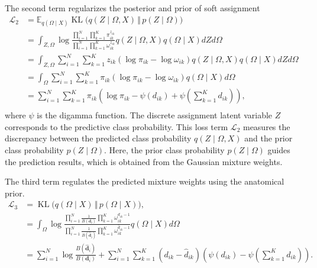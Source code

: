 \documentclass[preprint,12pt]{elsarticle}
\begin{document}
The second term regularizes the posterior and prior of soft assignment
\begin{equation}
\label{loss2}
\begin{split}
  \mathcal{L}_2  &= \mathbb{E}_{q(\Omega\mid X)}\operatorname{KL}\big(q(Z\mid \Omega, X)\,\Vert\,p(Z\mid \Omega)\big)\\
  &= \int_{Z,\Omega} \log \frac{\prod_{i=1}^N\prod_{k=1}^K \pi_{ik}^{z_{ik}}}{\prod_{i=1}^N\prod_{k=1}^K \omega_{ik}^{z_{ik}}} q(Z\mid \Omega, X)q(\Omega\mid X)dZd\Omega\\
  &= \int_{Z,\Omega} \sum_{i=1}^N\sum_{k=1}^K z_{ik} \left(\log\pi_{ik}- \log \omega_{ik} \right)q(Z\mid \Omega, X)q(\Omega\mid X)dZd\Omega\\ 
  &= \int_{\Omega} \sum_{i=1}^N\sum_{k=1}^K \pi_{ik} \left(\log\pi_{ik}- \log \omega_{ik} \right)q(\Omega\mid X)d\Omega\\   
  &= \sum_{i=1}^N\sum_{k=1}^K \pi_{ik} \left(\log\pi_{ik}- \psi(d_{ik}) +\psi\left(\sum_{k=1}^K d_{ik}\right) \right),\\     
\end{split}
\end{equation}
where $\psi$ is the digamma function.
The discrete assignment latent variable $Z$ corresponds to the predictive class probability. This loss term $\mathcal{L}_2$ measures the discrepancy between the predicted class probability $q(Z\mid \Omega, X)$ and the prior class probability $p(Z\mid \Omega)$. 
Here, the prior class probability $p(Z\mid \Omega)$ guides the prediction results, which is obtained from the Gaussian mixture weights. 


The third term regulates the predicted mixture weights using the anatomical prior.
\begin{equation}
\label{loss3}
\begin{split}
  \mathcal{L}_3  &= \operatorname{KL}\big(q(\Omega\mid X)\,\Vert\,p(\Omega\mid X)\big),\\
  &=\int_{\Omega} \log \frac{\prod_{i=1}^N\frac{1}{B(\boldsymbol{d}_i)}
\prod_{k=1}^K \omega_{ik}^{d_{ik} - 1}}{\prod_{i=1}^N\frac{1}{B(\boldsymbol{\hat{d}}_i)}
\prod_{k=1}^K \omega_{ik}^{\hat{d}_{ik} - 1}} q(\Omega\mid X) d\Omega\\
  &= \sum_{i=1}^N \log \frac{B(\boldsymbol{\hat{d}}_i)}{B(\boldsymbol{d}_i)}
+\sum_{i=1}^N\sum_{k=1}^K \left( d_{ik} - \hat{d}_{ik}\right) \left( \psi(d_{ik}) - \psi(\sum_{k=1}^K d_{ik}) \right).
\end{split}
\end{equation}
\end{document}

